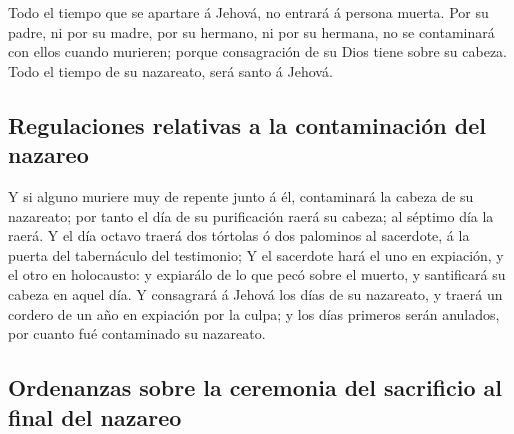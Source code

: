  Todo el tiempo que se apartare á Jehová, no entrará á
persona muerta.  Por su padre, ni por su madre, por su
hermano, ni por su hermana, no se contaminará con ellos cuando murieren;
porque consagración de su Dios tiene sobre su cabeza. 
Todo el tiempo de su nazareato, será santo á Jehová.

\hypertarget{regulaciones-relativas-a-la-contaminaciuxf3n-del-nazareo}{%
\subsection{Regulaciones relativas a la contaminación del
nazareo}\label{regulaciones-relativas-a-la-contaminaciuxf3n-del-nazareo}}

 Y si alguno muriere muy de repente junto á él,
contaminará la cabeza de su nazareato; por tanto el día de su
purificación raerá su cabeza; al séptimo día la raerá.  Y
el día octavo traerá dos tórtolas ó dos palominos al sacerdote, á la
puerta del tabernáculo del testimonio;  Y el sacerdote
hará el uno en expiación, y el otro en holocausto: y expiarálo de lo que
pecó sobre el muerto, y santificará su cabeza en aquel día.
 Y consagrará á Jehová los días de su nazareato, y traerá
un cordero de un año en expiación por la culpa; y los días primeros
serán anulados, por cuanto fué contaminado su nazareato.

\hypertarget{ordenanzas-sobre-la-ceremonia-del-sacrificio-al-final-del-nazareo}{%
\subsection{Ordenanzas sobre la ceremonia del sacrificio al final del
nazareo}\label{ordenanzas-sobre-la-ceremonia-del-sacrificio-al-final-del-nazareo}}

